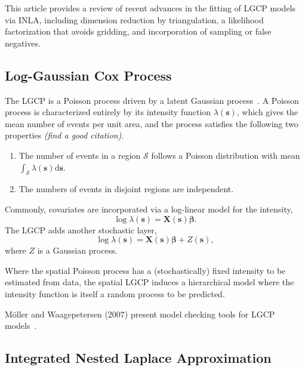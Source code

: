 \documentclass[]{interact}
\begin{document}
This article provides a review of recent advances in the fitting of LGCP models
via INLA, including dimension reduction by triangulation, a likelihood
factorization that avoids gridding, and incorporation of sampling or false
negatives.


\subsection{Log-Gaussian Cox Process}

The LGCP is a Poisson process driven by a latent Gaussian
process~\cite{moelleretal}. A Poisson process is characterized entirely by its
intensity function \(\lambda(\mathbf{s})\), which gives the mean number of events
per unit area, and the process satisfies the following two properties
{\it (find a good citation)}.
\begin{enumerate}
\item The number of events in a region \(\mathcal{S}\) follows a Poisson
distribution with mean
\(\int_{\mathcal{S}} \lambda(\mathbf{s})\mathrm{d}\mathbf{s}\).
\item The numbers of events in disjoint regions are independent.
\end{enumerate}

Commonly, covariates are incorporated via a log-linear model for the intensity,
\begin{displaymath}
\log\lambda(\mathbf{s}) = \mathbf{X}(\mathbf{s}) \boldsymbol{\beta}.
\end{displaymath}
The LGCP adds another stochastic layer,
\begin{displaymath}
\log\lambda(\mathbf{s}) = \mathbf{X}(\mathbf{s}) \boldsymbol{\beta}
+ Z(\mathbf{s}),
\end{displaymath}
where \(Z\) is a Gaussian process.

Where the spatial Poisson process has a (stochastically) fixed intensity to be
estimated from data, the spatial LGCP induces a hierarchical model where the
intensity function is itself a random process to be predicted.


M\"{o}ller and Waagepetersen (2007) present model checking tools for LGCP
models~\cite{moellerwaagepetersen}.


\subsection{Integrated Nested Laplace Approximation}
\end{document}
